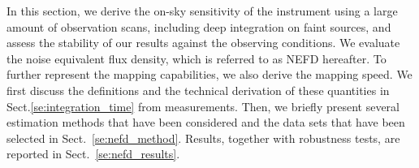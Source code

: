 
%

In this section, we derive the on-sky sensitivity of the instrument using a
large amount of observation scans, including deep integration on faint sources,
and assess the stability of our results against the observing
conditions.
We evaluate the noise equivalent flux density, which is referred to as
NEFD hereafter. To further represent the mapping capabilities, we also
derive the mapping speed.
We first discuss the definitions and the technical derivation of these quantities in
Sect.\ref{se:integration_time} from measurements. Then, we briefly present
several estimation methods that have been considered and the data sets that have
been selected in Sect.~\ref{se:nefd_method}. Results, together with robustness
tests, are reported in Sect.~\ref{se:nefd_results}.


